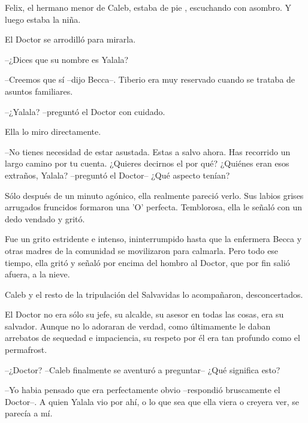 Felix, el hermano menor de Caleb, estaba de pie , escuchando con asombro. Y luego estaba la niña.
 
El Doctor se arrodilló para mirarla.
 
--¿Dices que su nombre es Yalala?
 
--Creemos que sí --dijo Becca--. Tiberio era muy reservado cuando se trataba de asuntos familiares.
 
--¿Yalala? --preguntó el Doctor con cuidado.
 
Ella lo miro directamente.
 
--No tienes necesidad de estar asustada. Estas a salvo ahora. Has recorrido un largo camino por tu cuenta. ¿Quieres decirnos el por qué? ¿Quiénes eran esos extraños, Yalala? --preguntó el Doctor-- ¿Qué aspecto tenían?
 
Sólo después de un minuto agónico, ella realmente pareció verlo. Sus labios grises arrugados fruncidos formaron una 'O' perfecta. Temblorosa, ella le señaló con un dedo vendado y gritó.
 
Fue un grito estridente e intenso, ininterrumpido hasta que la enfermera Becca y otras madres de la comunidad se movilizaron para calmarla. Pero todo ese tiempo, ella gritó y señaló por encima del hombro al Doctor, que por fin salió afuera, a la nieve.
 
Caleb y el resto de la tripulación del Salvavidas lo acompañaron, desconcertados.
 
El Doctor no era sólo su jefe, su alcalde, su asesor en todas las cosas, era su salvador. Aunque no lo adoraran de verdad, como últimamente le daban arrebatos de sequedad e impaciencia, su respeto por él era tan profundo como el permafrost.
 
--¿Doctor? --Caleb finalmente se aventuró a preguntar-- ¿Qué significa esto?
 
--Yo habia pensado que era perfectamente obvio --respondió bruscamente el Doctor--. A quien Yalala vio por ahí, o lo que sea que ella viera o creyera ver, se parecía a mí.
